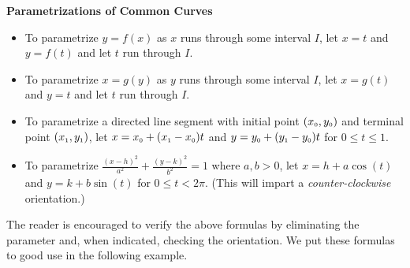 \colorbox{ResultColor}{\bbm

\label{commonparametrizations}


\centerline{\textbf{Parametrizations of Common Curves}}

\begin{itemize}

\item  To parametrize $y=f(x)$ as $x$ runs through some interval $I$, let $x=t$ and $y=f(t)$ and let $t$ run through $I$.

\item  To parametrize $x=g(y)$ as $y$ runs through some interval $I$, let $x=g(t)$ and $y=t$ and let $t$ run through $I$.

\item  To parametrize a directed line segment with initial point $(x_{\text{\tiny$0$}}, y_{\text{\tiny$0$}})$ and terminal point $(x_{\text{\tiny$1$}}, y_{\text{\tiny$1$}})$, let $x = x_{\text{\tiny$0$}} + (x_{\text{\tiny$1$}} - x_{\text{\tiny$0$}}) t$ and $y = y_{\text{\tiny$0$}} + (y_{\text{\tiny$1$}} - y_{\text{\tiny$0$}}) t$ for $0 \leq t \leq 1$.

\item  To parametrize  $\frac{(x-h)^2}{a^2} + \frac{(y-k)^2}{b^2} = 1$ where $a,b > 0$, let $x = h+a\cos(t)$ and $y=k+b\sin(t)$ for $0 \leq t < 2\pi$.  (This will impart a \textit{counter-clockwise} orientation.)

\end{itemize}

\ebm}

\smallskip

The reader is encouraged to verify the above formulas by eliminating the parameter and, when indicated, checking the orientation.  We put these formulas to good use in the following example.

